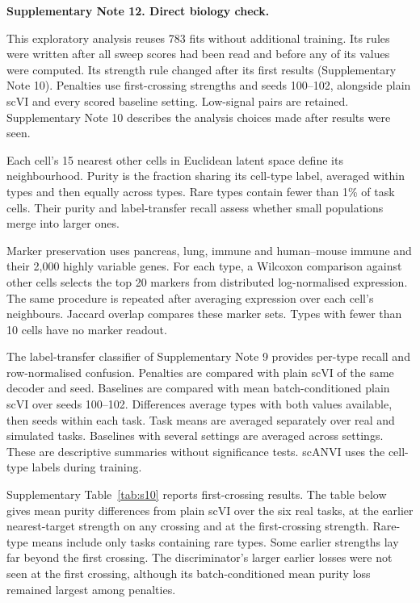 \medskip\noindent\textbf{Supplementary Note 12. Direct biology check.}\par\smallskip
\begingroup\small\setlength{\parskip}{3pt}
This exploratory analysis reuses 783 fits without additional training. Its rules were written after all sweep scores had been read and before any of its values were computed. Its strength rule changed after its first results (Supplementary Note 10). Penalties use first-crossing strengths and seeds 100--102, alongside plain scVI and every scored baseline setting. Low-signal pairs are retained. Supplementary Note 10 describes the analysis choices made after results were seen.

Each cell's 15 nearest other cells in Euclidean latent space define its neighbourhood. Purity is the fraction sharing its cell-type label, averaged within types and then equally across types. Rare types contain fewer than 1\% of task cells. Their purity and label-transfer recall assess whether small populations merge into larger ones.

Marker preservation uses pancreas, lung, immune and human--mouse immune and their 2,000 highly variable genes. For each type, a Wilcoxon comparison against other cells selects the top 20 markers from distributed log-normalised expression. The same procedure is repeated after averaging expression over each cell's neighbours. Jaccard overlap compares these marker sets. Types with fewer than 10 cells have no marker readout.

The label-transfer classifier of Supplementary Note 9 provides per-type recall and row-normalised confusion. Penalties are compared with plain scVI of the same decoder and seed. Baselines are compared with mean batch-conditioned plain scVI over seeds 100--102. Differences average types with both values available, then seeds within each task. Task means are averaged separately over real and simulated tasks. Baselines with several settings are averaged across settings. These are descriptive summaries without significance tests. scANVI uses the cell-type labels during training.

Supplementary Table~\ref{tab:s10} reports first-crossing results. The table below gives mean purity differences from plain scVI over the six real tasks, at the earlier nearest-target strength on any crossing and at the first-crossing strength. Rare-type means include only tasks containing rare types. Some earlier strengths lay far beyond the first crossing. The discriminator's larger earlier losses were not seen at the first crossing, although its batch-conditioned mean purity loss remained largest among penalties.

